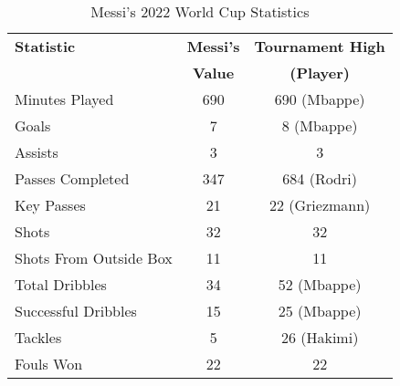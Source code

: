 \begin{table}[h!]
    \centering
    \caption{Messi's 2022 World Cup Statistics}
    \begin{tabular}{lcc}
    \hline
    \textbf{Statistic} & \textbf{Messi's} & \textbf{Tournament High} \\
    & \textbf{Value} & \textbf{(Player)} \\ \hline
    Minutes Played & 690 & 690 (Mbappe) \\
    Goals & 7 & 8 (Mbappe) \\
    Assists & 3 & 3 \\
    Passes Completed & 347 & 684 (Rodri) \\
    Key Passes & 21 & 22 (Griezmann) \\
    Shots & 32 & 32 \\
    Shots From Outside Box & 11 & 11 \\
    Total Dribbles & 34 & 52 (Mbappe) \\
    Successful Dribbles & 15 & 25 (Mbappe) \\
    Tackles & 5 & 26 (Hakimi) \\
    Fouls Won & 22 & 22 \\ \hline
    \end{tabular}
    \label{tab:messi_worldcup_stats}
\end{table}
